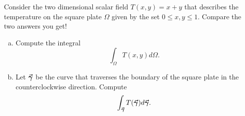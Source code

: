 \documentclass[12pt]{article} %
\begin{document}
\begin{problem}
Consider the two dimensional scalar field $T(x,y)=x+y$ that describes the temperature on the square plate $\Omega$ given by the set $0\leq x,y \leq 1$.  Compare the two answers you get!
\begin{enumerate}[(a)]
	\item Compute the integral
	\[
	\int_\Omega T(x,y)d\Omega.
	\]
	\item Let $\boldsymbol{\vec{\gamma}}$ be the curve that traverses the boundary of the square plate in the counterclockwise direction.  Compute
	\[
	\int_{\boldsymbol{\vec{\gamma}}} T(\boldsymbol{\vec{\gamma}})d\boldsymbol{\vec{\gamma}}. 
	\]
\end{enumerate}
\end{problem}
\end{document}
